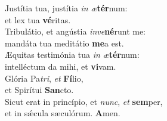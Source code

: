 \evenverse Justítia tua, justítia \textit{in} \textit{æ}\textbf{tér}num:~\*\\
\evenverse et lex tua \textbf{vé}ritas.\\
\oddverse Tribulátio, et angústia \textit{in}\textit{ve}\textbf{né}runt me:~\*\\
\oddverse mandáta tua meditátio \textbf{me}a est.\\
\evenverse Æquitas testimónia tua \textit{in} \textit{æ}\textbf{tér}num:~\*\\
\evenverse intelléctum da mihi, et \textbf{vi}vam.\\
\oddverse Glória Pa\textit{tri}, \textit{et} \textbf{Fí}lio,~\*\\
\oddverse et Spirítui \textbf{San}cto.\\
\evenverse Sicut erat in princípio, et \textit{nunc}, \textit{et} \textbf{sem}per,~\*\\
\evenverse et in sǽcula sæculórum. \textbf{A}men.\\
